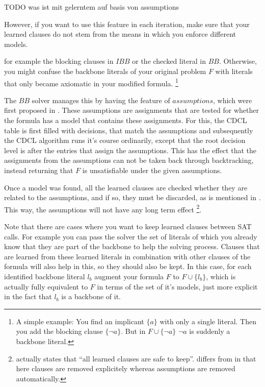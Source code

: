 TODO was ist mit gelerntem auf basis von assumptions

\iffalse

However, if you want to use this feature in each iteration, make sure that your learned clauses do not stem from the means in which you enforce different models.

 for example the blocking clauses in $IBB$ or the checked literal in $BB$. Otherwise, you might confuse the backbone literals of your original problem $F$ with literals that only became axiomatic in your modified formula. \footnote{A simple example: You find an implicant $\{a\}$ with only a single literal. Then you add the blocking clause $\{\neg a\}$. But in $F \cup \{\neg a\}$ $\neg a$ is suddenly a backbone literal.}

The $BB$ solver manages this by having the feature of $assumptions$, which were first proposed in \cite{ENSO03}. These assumptions are assignments that are tested for whether the formula has a model that contains these assignments. For this, the CDCL table is first filled with decisions, that match the assumptions and subsequently the CDCL algorithm runs it's course ordinarily, except that the root decision level is after the entries that assign the assumptions. This has the effect that the assignments from the assumptions can not be taken back through backtracking, instead returning that $F$ is unsatisfiable under the given assumptions.

Once a model was found, all the learned clauses are checked whether they are related to the assumptions, and if so, they must be discarded, as is mentioned in \cite{WKS01}. This way, the assumptions will not have any long term effect
\footnote{\cite{ENSO03} actually states that ``all learned clauses are safe to keep''. \cite{WKS01} differs from \cite{ENSO03} in that here clauses are removed explicitely whereas assumptions are removed automatically.}.


Note that there are cases where you want to keep learned clauses between SAT calls. For example you can pass the solver the set of literals of which you already know that they are part of the backbone to help the solving process. Clauses that are learned from these learned literals in combination with other clauses of the formula will also help in this, so they should also be kept. In this case, for each identified backbone literal $l_b$ augment your formula $F$ to $F \cup \{l_b\}$, which is actually fully equivalent to $F$ in terms of the set of it's models, just more explicit in the fact that $l_b$ is a backbone of it.


